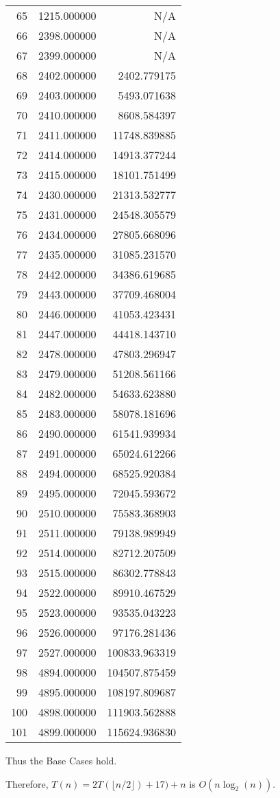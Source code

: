 \begin{longtable}{r|r|r}
	 65 & 1215.000000 & N/A \\
	 66 & 2398.000000 & N/A \\
	 67 & 2399.000000 & N/A \\
	 68 & 2402.000000 & 2402.779175   \\
	 69 & 2403.000000 & 5493.071638   \\
	 70 & 2410.000000 & 8608.584397   \\
	 71 & 2411.000000 & 11748.839885  \\
	 72 & 2414.000000 & 14913.377244  \\
	 73 & 2415.000000 & 18101.751499  \\
	 74 & 2430.000000 & 21313.532777  \\
	 75 & 2431.000000 & 24548.305579  \\
	 76 & 2434.000000 & 27805.668096  \\
	 77 & 2435.000000 & 31085.231570  \\
	 78 & 2442.000000 & 34386.619685  \\
	 79 & 2443.000000 & 37709.468004  \\
	 80 & 2446.000000 & 41053.423431  \\
	 81 & 2447.000000 & 44418.143710  \\
	 82 & 2478.000000 & 47803.296947  \\
	 83 & 2479.000000 & 51208.561166  \\
	 84 & 2482.000000 & 54633.623880  \\
	 85 & 2483.000000 & 58078.181696  \\
	 86 & 2490.000000 & 61541.939934  \\
	 87 & 2491.000000 & 65024.612266  \\
	 88 & 2494.000000 & 68525.920384  \\
	 89 & 2495.000000 & 72045.593672  \\
	 90 & 2510.000000 & 75583.368903  \\
	 91 & 2511.000000 & 79138.989949  \\
	 92 & 2514.000000 & 82712.207509  \\
	 93 & 2515.000000 & 86302.778843  \\
	 94 & 2522.000000 & 89910.467529  \\
	 95 & 2523.000000 & 93535.043223  \\
	 96 & 2526.000000 & 97176.281436  \\
	 97 & 2527.000000 & 100833.963319 \\
	 98 & 4894.000000 & 104507.875459 \\
	 99 & 4895.000000 & 108197.809687 \\
	100 & 4898.000000 & 111903.562888 \\
	101 & 4899.000000 & 115624.936830 \\
\end{longtable}
\noindent Thus the Base Cases hold.

Therefore, $T(n) = 2T(\lfloor n / 2 \rfloor) + 17) + n$ is $O(n\log_2(n))$.
